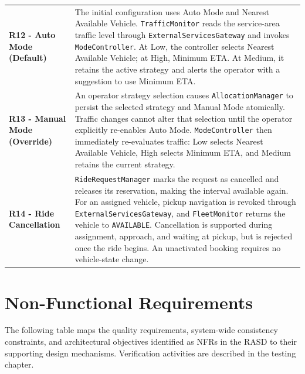 \documentclass[11pt,a4paper,oneside]{report}
\renewcommand{\arraystretch}{1.22}
\newcommand{\code}[1]{\texttt{#1}}
\begin{document}
\begin{longtable}{@{}
    >{\raggedright\arraybackslash}p{}
    >{\raggedright\arraybackslash}p{}
@{}}
\textbf{R12 - Auto Mode (Default)}
&
The initial configuration uses Auto Mode and Nearest Available Vehicle.
\code{TrafficMonitor} reads the service-area traffic level through
\code{ExternalServicesGateway} and invokes \code{ModeController}.
At Low, the controller selects Nearest Available Vehicle; at High,
Minimum ETA. At Medium, it retains the active strategy and alerts the
operator with a suggestion to use Minimum ETA.
\\

\textbf{R13 - Manual Mode (Override)}
&
An operator strategy selection causes \code{AllocationManager} to
persist the selected strategy and Manual Mode atomically.
Traffic changes cannot alter that selection until the operator
explicitly re-enables Auto Mode. \code{ModeController} then immediately
re-evaluates traffic: Low selects Nearest Available Vehicle, High selects
Minimum ETA, and Medium retains the current strategy.
\\


\textbf{R14 - Ride Cancellation}
&
\code{RideRequestManager} marks the request as cancelled and releases
its reservation, making the interval available again. For an assigned
vehicle, pickup navigation is revoked through
\code{ExternalServicesGateway}, and \code{FleetMonitor} returns the
vehicle to \code{AVAILABLE}. Cancellation is supported during
assignment, approach, and waiting at pickup, but is rejected once the
ride begins. An unactivated booking requires no vehicle-state change.
\\

\end{longtable}
\endgroup

\section{Non-Functional Requirements}
\label{non-functional-requirements}

The following table maps the quality requirements, system-wide
consistency constraints, and architectural objectives identified as
NFRs in the RASD to their supporting design mechanisms.
Verification activities are described in the testing chapter.

\begingroup
\small
\setlength{\tabcolsep}{5pt}
\renewcommand{\arraystretch}{1.2}
\end{document}
